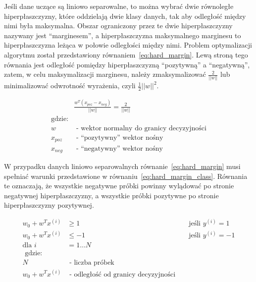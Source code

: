 Jeśli dane uczące są liniowo separowalne, to można wybrać dwie równoległe hiperpłaszczyzny,
które oddzielają dwie klasy danych, tak aby odległość między nimi była maksymalna.
Obszar ograniczony przez te dwie hiperpłaszczyzny nazywany jest ``marginesem'',
a hiperpłaszczyzna maksymalnego marginesu to hiperpłaszczyzna leżąca w połowie odległości między nimi.
Problem optymalizacji algorytmu został przedstawiony równaniem~\ref{eq:hard_margin}.
Lewą stroną tego równania jest odległość pomiędzy hiperpłaszczyzną ``pozytywną'' a ``negatywną'',
zatem, w celu maksymalizacji marginesu, należy zmaksymalizować $\frac{2}{||w||}$ lub
minimalizować odwrotność wyrażenia, czyli $\frac{1}{2}||w||^2$.

\begin{equation}
    \begin{aligned}
        & \frac{ w^T (x_{poz} - x_{neg}) }{ ||w|| } = \frac{2}{||w||} \\
        \text{gdzie:} \\
        w & \text{ - wektor normalny do granicy decyzyjności}
        \\
        x_{poz} & \text{ - ``pozytywny'' wektor nośny}
        \\
        x_{neg} & \text{ - ``negatywny'' wektor nośny}
    \end{aligned}
    \label{eq:hard_margin}
\end{equation}
\bigskip

W przypadku danych liniowo separowalnych równanie~\ref{eq:hard_margin} musi
spełniać warunki przedstawione w równaniu~\ref{eq:hard_margin_class}.
Równania te oznaczają, że wszystkie negatywne próbki powinny wylądować po stronie
negatywnej hiperpłaszczyzny, a wszystkie próbki pozytywne po stronie hiperpłaszczyzny pozytywnej.

\begin{equation}
    \begin{aligned}
        w_0 +w^{T}x^{(i)} &\geq 1 && \text{ jeśli } y^{(i)} =1
        \\
        w_0 +w^{T}x^{(i)} &\leq -1 && \text{ jeśli } y^{(i)} =-1
        \\
        \text{dla } i&= 1\dots N
        \\
        \text{ gdzie: } \\
        N & \text{  - liczba próbek}
        \\
        w_0 +w^{T}x^{(i)} & \text{  - odległość od granicy decyzyjności}
    \end{aligned}
    \label{eq:hard_margin_class}
\end{equation}

